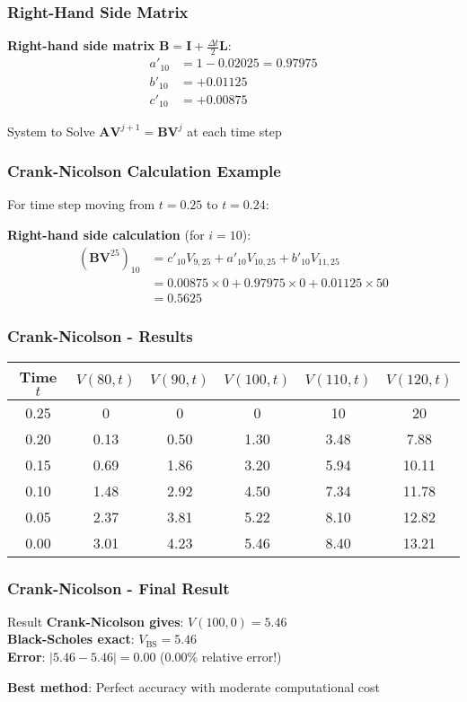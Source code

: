\documentclass[aspectratio=169]{beamer}
\begin{document}
\begin{frame}
\frametitle{Right-Hand Side Matrix}
\textbf{Right-hand side matrix} \(\mathbf{B} = \mathbf{I} + \frac{\Delta t}{2}\mathbf{L}\):
\begin{align}
a'_{10} &= 1 - 0.02025 = 0.97975 \\
b'_{10} &= +0.01125 \\
c'_{10} &= +0.00875
\end{align}

\begin{block}{System to Solve}
\(\mathbf{A} \mathbf{V}^{j+1} = \mathbf{B} \mathbf{V}^j\) at each time step
\end{block}
\end{frame}

\begin{frame}
\frametitle{Crank-Nicolson Calculation Example}
For time step moving from \(t = 0.25\) to \(t = 0.24\):

\textbf{Right-hand side calculation} (for \(i = 10\)):
\begin{align}
(\mathbf{B}\mathbf{V}^{25})_{10} &= c'_{10} V_{9,25} + a'_{10} V_{10,25} + b'_{10} V_{11,25} \\
&= 0.00875 \times 0 + 0.97975 \times 0 + 0.01125 \times 50 \\
&= 0.5625
\end{align}
\end{frame}

\begin{frame}
\frametitle{Crank-Nicolson - Results}
\begin{center}
\begin{tabular}{c|c|c|c|c|c}
Time \(t\) & \(V(80,t)\) & \(V(90,t)\) & \(V(100,t)\) & \(V(110,t)\) & \(V(120,t)\) \\
\hline
0.25 & 0 & 0 & 0 & 10 & 20 \\
0.20 & 0.13 & 0.50 & 1.30 & 3.48 & 7.88 \\
0.15 & 0.69 & 1.86 & 3.20 & 5.94 & 10.11 \\
0.10 & 1.48 & 2.92 & 4.50 & 7.34 & 11.78 \\
0.05 & 2.37 & 3.81 & 5.22 & 8.10 & 12.82 \\
0.00 & 3.01 & 4.23 & 5.46 & 8.40 & 13.21 \\
\end{tabular}
\end{center}
\end{frame}

\begin{frame}
\frametitle{Crank-Nicolson - Final Result}
\begin{block}{Result}
\textbf{Crank-Nicolson gives}: \(V(100, 0) = 5.46\)\\
\textbf{Black-Scholes exact}: \(V_{\text{BS}} = 5.46\)\\
\textbf{Error}: \(|5.46 - 5.46| = 0.00\) (0.00\% relative error!)
\end{block}

\textbf{Best method}: Perfect accuracy with moderate computational cost
\end{frame}
\end{document}
